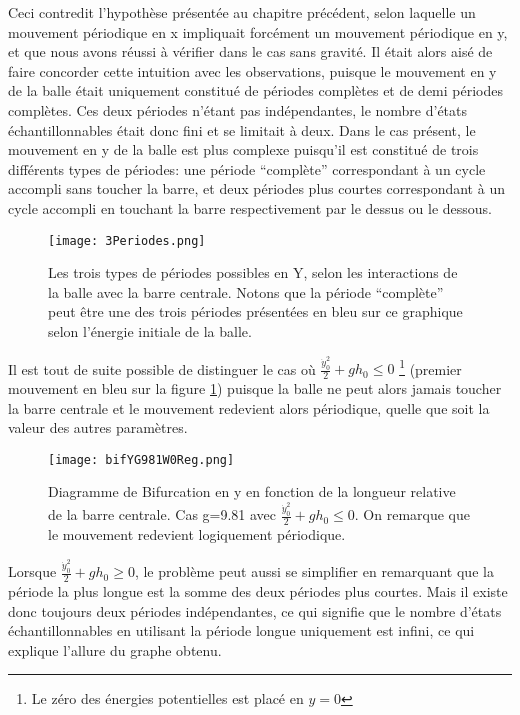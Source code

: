 \documentclass[a4paper]{report}
\begin{document}
Ceci contredit l'hypothèse présentée au chapitre précédent, selon laquelle un mouvement périodique en x impliquait forcément un mouvement périodique en y, et que nous avons réussi à vérifier dans le cas sans gravité. Il était alors aisé de faire concorder cette intuition avec les observations, puisque le mouvement en y de la balle était uniquement constitué de périodes complètes et de demi périodes complètes. Ces deux périodes n'étant pas indépendantes, le nombre d'états échantillonnables était donc fini et se limitait à deux. Dans le cas présent, le mouvement en y de la balle est plus complexe puisqu'il est constitué de trois différents types de périodes: une période ``complète'' correspondant à un cycle accompli sans toucher la barre, et deux périodes plus courtes correspondant à un cycle accompli en touchant la barre respectivement par le dessus ou le dessous.
\begin{figure}[h!]
   \texttt{[image: 3Periodes.png]}
      \caption[Les trois types de périodes possible en Y]{Les trois types de périodes possibles en Y, selon les interactions de la balle avec la barre centrale. Notons que la période ``complète'' peut être une des trois périodes présentées en bleu sur ce graphique selon l'énergie initiale de la balle.}
   \label{fig:typesPeriodes}
\end{figure}

Il est tout de suite possible de distinguer le cas où \(\frac{\dot{y}_0^2}{2} + gh_0 \leq 0\) \footnote{Le zéro des énergies potentielles est placé en \(y=0\)} (premier mouvement en bleu sur la figure \ref{fig:typesPeriodes}) puisque la balle ne peut alors jamais toucher la barre centrale et le mouvement redevient alors périodique, quelle que soit la valeur des autres paramètres.
\begin{figure}[h!]
   \texttt{[image: bifYG981W0Reg.png]}
      \caption[Diagramme de Bifurcation en y: g=9.81  \(\; \frac{\dot{y}_0^2}{2} + gh_0 \leq 0\)]{Diagramme de Bifurcation en y en fonction de la longueur relative de la barre centrale. Cas g=9.81 avec \(\frac{\dot{y}_0^2}{2} + gh_0 \leq 0\). On remarque que le mouvement redevient logiquement périodique.}
\end{figure}
Lorsque \(\frac{\dot{y}_0^2}{2} + gh_0 \geq 0\), le problème peut aussi se simplifier en remarquant que la période la plus longue est la somme des deux périodes plus courtes\label{propr:sommePeriodes}. Mais il existe donc toujours deux périodes indépendantes, ce qui signifie que le nombre d'états échantillonnables en utilisant la période longue uniquement est infini, ce qui explique l'allure du graphe obtenu.
\end{document}
